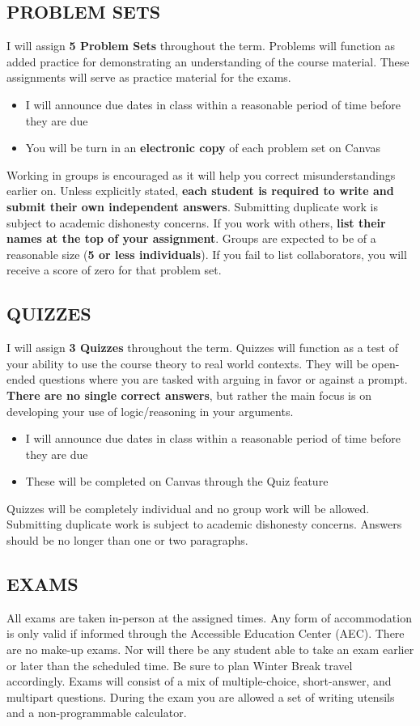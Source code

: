 \documentclass[11pt]{article}
\begin{document}
\subsection*{PROBLEM SETS}
I will assign \textbf{5 Problem Sets} throughout the term. 
Problems will function as added practice for demonstrating an understanding of the course material. 
These assignments will serve as practice material for the exams. 
\begin{itemize}
    \item I will announce due dates in class within a reasonable period of time before they are due
    \item You will be turn in an \textbf{electronic copy} of each problem set on Canvas
\end{itemize}
Working in groups is encouraged as it will help you correct misunderstandings earlier on. 
Unless explicitly stated, \textbf{each student is required to write and submit their own independent answers}. 
Submitting duplicate work is subject to academic dishonesty concerns. 
If you work with others, \textbf{list their names at the top of your assignment}. 
Groups are expected to be of a reasonable size (\textbf{5 or less individuals}). 
If you fail to list collaborators, you will receive a score of zero for that problem set. 

\subsection*{QUIZZES}
I will assign \textbf{3 Quizzes} throughout the term. 
Quizzes will function as a test of your ability to use the course theory to real world contexts. 
They will be open-ended questions where you are tasked with arguing in favor or against a prompt. 
\textbf{There are no single correct answers}, but rather the main focus is on developing your use of logic/reasoning in your arguments. 

\begin{itemize}
    \item I will announce due dates in class within a reasonable period of time before they are due
    \item These will be completed on Canvas through the Quiz feature
\end{itemize}
Quizzes will be completely individual and no group work will be allowed. 
Submitting duplicate work is subject to academic dishonesty concerns. 
Answers should be no longer than one or two paragraphs. 

\subsection*{EXAMS}
All exams are taken in-person at the assigned times. 
Any form of accommodation is only valid if informed through the Accessible Education Center (AEC).
There are no make-up exams. 
Nor will there be any student able to take an exam earlier or later than the scheduled time. 
Be sure to plan Winter Break travel accordingly. 
Exams will consist of a mix of multiple-choice, short-answer, and multipart questions. 
During the exam you are allowed a set of writing utensils and a non-programmable calculator. 
\end{document}

